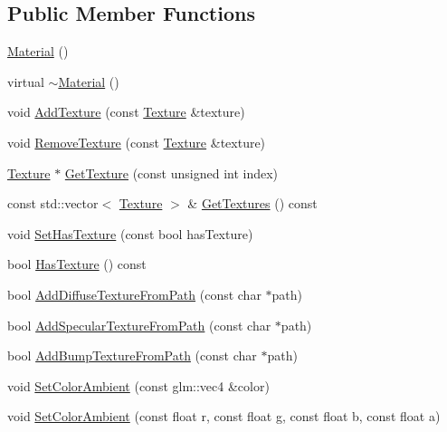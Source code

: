 \subsection*{Public Member Functions}
\begin{DoxyCompactItemize}
\item 
\mbox{\hyperlink{classec_1_1_material_a259d88ca352df2d284380f0b37052652}{Material}} ()
\item 
virtual \mbox{\hyperlink{classec_1_1_material_aec5bd3f3ef761f49a5028b415a9de52e}{$\sim$\+Material}} ()
\item 
void \mbox{\hyperlink{classec_1_1_material_a56e14ac3904504ef549bad2c26ad6ca1}{Add\+Texture}} (const \mbox{\hyperlink{classec_1_1_texture}{Texture}} \&texture)
\item 
void \mbox{\hyperlink{classec_1_1_material_aeef09ee7b9157378a8673ffdb8b106d2}{Remove\+Texture}} (const \mbox{\hyperlink{classec_1_1_texture}{Texture}} \&texture)
\item 
\mbox{\hyperlink{classec_1_1_texture}{Texture}} $\ast$ \mbox{\hyperlink{classec_1_1_material_abfb0746022166a7c33139435b3a06cd4}{Get\+Texture}} (const unsigned int index)
\item 
const std\+::vector$<$ \mbox{\hyperlink{classec_1_1_texture}{Texture}} $>$ \& \mbox{\hyperlink{classec_1_1_material_a2142cd907afb9c429c4e3e640494e986}{Get\+Textures}} () const
\item 
void \mbox{\hyperlink{classec_1_1_material_a4627bb1f7d6a3b9e3a297f16fcdde25a}{Set\+Has\+Texture}} (const bool has\+Texture)
\item 
bool \mbox{\hyperlink{classec_1_1_material_a0843cf9b2ebb5ba69677a45998112190}{Has\+Texture}} () const
\item 
bool \mbox{\hyperlink{classec_1_1_material_abd2471992a8b82cf65ff65eba499d85d}{Add\+Diffuse\+Texture\+From\+Path}} (const char $\ast$path)
\item 
bool \mbox{\hyperlink{classec_1_1_material_a323e90a5acd82fa056c952b429e93eb4}{Add\+Specular\+Texture\+From\+Path}} (const char $\ast$path)
\item 
bool \mbox{\hyperlink{classec_1_1_material_a4c51ac86593060d1f51b0eaf6b6fe914}{Add\+Bump\+Texture\+From\+Path}} (const char $\ast$path)
\item 
void \mbox{\hyperlink{classec_1_1_material_a888169cd012fa3b9fc3baa0eee416bb8}{Set\+Color\+Ambient}} (const glm\+::vec4 \&color)
\item 
void \mbox{\hyperlink{classec_1_1_material_abe9b869894565ed4dcf26c6a195e1132}{Set\+Color\+Ambient}} (const float r, const float g, const float b, const float a)

\end{DoxyCompactItemize}
